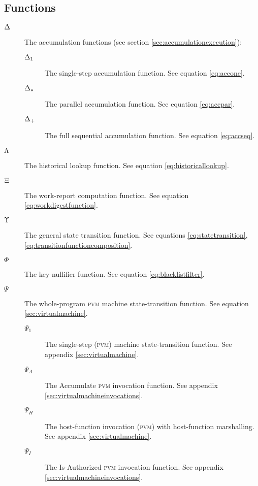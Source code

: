 \subsection{Functions}

\begin{description}
  \item[$\Delta$] The accumulation functions (see section \ref{sec:accumulationexecution}):
  \begin{description}
    \item[$\Delta_1$] The single-step accumulation function. See equation \ref{eq:accone}.
    \item[$\Delta_*$] The parallel accumulation function. See equation \ref{eq:accpar}.
    \item[$\Delta_+$] The full sequential accumulation function. See equation \ref{eq:accseq}.
  \end{description}
  \item[$\Lambda$] The historical lookup function. See equation \ref{eq:historicallookup}.
  \item[$\Xi$] The work-report computation function. See equation \ref{eq:workdigestfunction}.
  \item[$\Upsilon$] The general state transition function. See equations \ref{eq:statetransition}, \ref{eq:transitionfunctioncomposition}.
  \item[$\Phi$] The key-nullifier function. See equation \ref{eq:blacklistfilter}.
  \item[$\Psi$] The whole-program \textsc{pvm} machine state-transition function. See equation \ref{sec:virtualmachine}.
  \begin{description}
    \item[$\Psi_1$] The single-step (\textsc{pvm}) machine state-transition function. See appendix \ref{sec:virtualmachine}.
    \item[$\Psi_A$] The Accumulate \textsc{pvm} invocation function. See appendix \ref{sec:virtualmachineinvocations}.
    \item[$\Psi_H$] The host-function invocation (\textsc{pvm}) with host-function marshalling. See appendix \ref{sec:virtualmachine}.
    \item[$\Psi_I$] The Is-Authorized \textsc{pvm} invocation function. See appendix \ref{sec:virtualmachineinvocations}.

\end{description}
\end{description}
